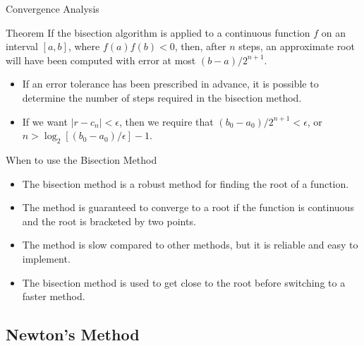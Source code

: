 \documentclass{beamer}
\begin{document}
\begin{frame}{Convergence Analysis}
\begin{block}{Theorem}
  If the bisection algorithm is applied to a continuous function $f$ on an interval $[a, b]$, 
  where $f(a) f(b)<0$, then, after $n$ steps, an approximate root will have been computed with 
  error at most $(b-a) / 2^{n+1}$.
  \end{block}
\begin{itemize}
\item If an error tolerance has been prescribed in advance, it is possible to determine the number of steps required in the bisection method.
\item If we want $\left|r-c_n\right|<\epsilon$, then we require that $(b_0-a_0)/2^{n+1}<\epsilon$, or $n>\log_2[(b_0-a_0)/\epsilon]-1$.
\end{itemize}
\end{frame}

\begin{frame}{When to use the Bisection Method}
\begin{itemize}
\item The bisection method is a robust method for finding the root of a function.
\item The method is guaranteed to converge to a root if the function is continuous and the root is bracketed by two points.
\item The method is slow compared to other methods, but it is reliable and easy to implement.
\item The bisection method is used to get close to the root before switching to a faster method.
\end{itemize}
\end{frame}
\subsection{Newton's Method}
\end{document}
